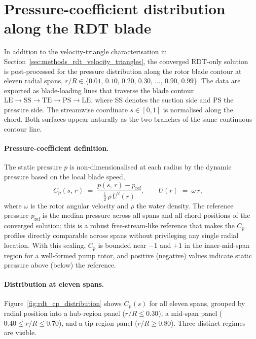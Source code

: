 \section{Pressure-coefficient distribution along the RDT blade}
\label{sec:methods_rdt_cp}
 
In addition to the velocity-triangle characterisation in
Section~\ref{sec:methods_rdt_velocity_triangles}, the converged RDT-only
solution is post-processed for the pressure distribution along the
rotor blade contour at eleven radial spans, $r/R\in\{0.01,\,0.10,\,
0.20,\,0.30,\,\ldots,\,0.90,\,0.99\}$. The data are exported as
blade-loading lines that traverse the blade contour
$\mathrm{LE}\to\mathrm{SS}\to\mathrm{TE}\to\mathrm{PS}\to\mathrm{LE}$,
where SS denotes the suction side and PS the pressure side. The
streamwise coordinate $s\in[0,1]$ is normalised along the chord. Both
surfaces appear naturally as the two branches of the same continuous
contour line.
 
\paragraph{Pressure-coefficient definition.}
The static pressure $p$ is non-dimensionalised at each radius by the
dynamic pressure based on the local blade speed,
%
\begin{equation}
C_p(s,\,r) \;=\; \frac{p(s,\,r) - p_{\mathrm{ref}}}
                       {\frac{1}{2}\,\rho\,U^{2}(r)},
\qquad
U(r) \;=\; \omega\,r,
\label{eq:Cp_definition}
\end{equation}
%
where $\omega$ is the rotor angular velocity and $\rho$ the water
density. The reference pressure $p_{\mathrm{ref}}$ is the median
pressure across all spans and all chord positions of the converged
solution; this is a robust free-stream-like reference that makes the
$C_p$ profiles directly comparable across spans without privileging any
single radial location. With this scaling, $C_p$ is bounded near $-1$
and $+1$ in the inner-mid-span region for a well-formed pump rotor, and
positive (negative) values indicate static pressure above (below) the
reference.
 
\paragraph{Distribution at eleven spans.}
Figure~\ref{fig:rdt_cp_distribution} shows $C_p(s)$ for all eleven
spans, grouped by radial position into a hub-region panel
($r/R\leq 0.30$), a mid-span panel ($0.40\leq r/R\leq 0.70$), and a
tip-region panel ($r/R\geq 0.80$). Three distinct regimes are visible.
 
